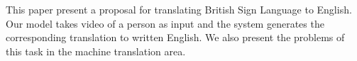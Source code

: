 This paper present a proposal for translating British Sign Language to English. Our model takes video of a person as input and the system generates the corresponding translation to written English. We also present the problems of this task in the machine translation area.
